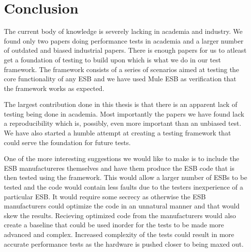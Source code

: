 \section{Conclusion}

The current body of knowledge is severely lacking in academia and industry. We found only two papers doing performance tests in academia and a larger number of outdated and biased industrial papers.
There is enough papers for us to atleast get a foundation of testing to build upon which is what we do in our test framework. The framework consists of a series of scenarios aimed at testing the core functionality of any ESB and we have used Mule ESB as verification that the framework works as expected. 


The largest contribution done in this thesis is that there is an apparent lack of testing being done in academia. 
Most importantly the papers we have found \cite{Sanjay2011} lack a reproducibility which is, possibly, even more important than an unbiased test. 
We have also started a humble attempt at creating a testing framework that could serve the foundation for future tests. 

One of the more interesting suggestions we would like to make is to include the ESB manufactureres themselves and have them produce the ESB code that is then tested using the framework. 
This would allow a larger number of ESBs to be tested and the code would contain less faults due to the testers inexperience of a particular ESB. 
It would require some secrecy as otherwise the ESB manufacturers could optimize the code in an unnatural manner and that would skew the results. 
Recieving optimized code from the manufacturers would also create a baseline that could be used inorder for the tests to be made more advanced and complex.
Increased complexity of the tests could result in more accurate performance tests as the hardware is pushed closer to being maxed out. 
